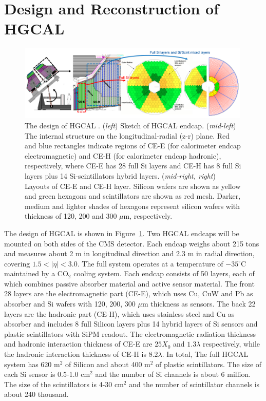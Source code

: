 \section{Design and Reconstruction of HGCAL}
\label{sec:hgcal:design}


\begin{figure}[ht]
    \centering
    \includegraphics[trim=0cm 0cm 0cm 0cm, clip,width=0.99\textwidth]{chapters/HGCal/figures/chep/hgcal2.png} 
    \caption{ The design of HGCAL \cite{Collaboration:2293646}. (\emph{left}) Sketch of HGCAL endcap. (\emph{mid-left}) The internal structure on the longitudinal-radial (z-r) plane. Red and blue rectangles indicate regions of CE-E (for calorimeter endcap electromagnetic) and CE-H (for calorimeter endcap hadronic), respectively, where CE-E has 28 full Si layers and CE-H has 8 full Si layers plus 14 Si-scintillators hybrid layers. (\emph{mid-right, right}) Layouts of CE-E and CE-H layer. Silicon wafers are shown as yellow and green hexagons and scintillators are shown as red mesh. Darker, medium and lighter shades of hexagons represent silicon wafers with thickness of 120, 200 and 300 $\mu$m, respectively.
    }
    \label{fig:hgcal}
\end{figure}

The design of HGCAL \cite{Collaboration:2293646} is shown in Figure~\ref{fig:hgcal}. Two HGCAL endcaps will be mounted on both sides of the CMS detector. Each endcap weighs about 215 tons and measures about 2 m in longitudinal direction and 2.3 m in radial direction, covering $1.5<|\eta|<3.0$. The full system operates at a temperature of $-35^\circ$C maintained by a CO$_2$ cooling system. Each endcap consists of 50 layers, each of which combines passive absorber material and active sensor material. The front 28 layers are the electromagnetic part (CE-E), which uses Cu, CuW and Pb as absorber and Si wafers with 120, 200, 300 $\mu$m thickness as sensors. The back 22 layers are the hadronic part (CE-H), which uses stainless steel and Cu as absorber and includes 8 full Silicon layers plus 14 hybrid layers of Si sensors and plastic scintillators with SiPM readout. The electromagnetic radiation thickness and hadronic interaction thickness of CE-E are $25 X_0$ and $1.3 \lambda$ respectively, while the hadronic interaction thickness of CE-H is $8.2 \lambda$. In total, The full HGCAL system has 620 m$^2$ of Silicon and about 400 m$^2$ of plastic scintillators. The size of each Si sensor is 0.5-1.0 cm$^2$ and the number of Si channels is about 6 million. The size of the scintillators is 4-30 cm$^2$ and the number of scintillator channels is about 240 thousand.


